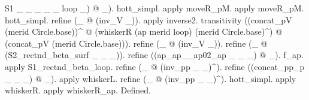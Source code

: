 \begin{coqdoccode}
\begin{coqdoccomment}
S1\coqdocindent{0.50em}
\_\coqdocindent{0.50em}
\_\coqdocindent{0.50em}
\_\coqdocindent{0.50em}
\_\coqdocindent{0.50em}
\_\coqdocindent{0.50em}
loop\coqdocindent{0.50em}
\_)\coqdocindent{0.50em}
@\coqdocindent{0.50em}
\_).\coqdoceol
\coqdocindent{1.00em}
hott\_simpl.\coqdocindent{0.50em}
\coqdoceol
\coqdocindent{1.00em}
apply\coqdocindent{0.50em}
moveR\_pM.\coqdocindent{0.50em}
apply\coqdocindent{0.50em}
moveR\_pM.\coqdocindent{0.50em}
hott\_simpl.\coqdocindent{0.50em}
refine\coqdocindent{0.50em}
(\_\coqdocindent{0.50em}
@\coqdocindent{0.50em}
(inv\_V\coqdocindent{0.50em}
\_)).\coqdocindent{0.50em}
\coqdoceol
\coqdocindent{1.00em}
apply\coqdocindent{0.50em}
inverse2.\coqdoceol
\coqdocindent{1.00em}
transitivity\coqdocindent{0.50em}
((concat\_pV\coqdocindent{0.50em}
(merid\coqdocindent{0.50em}
Circle.base))\^{}\coqdoceol
\coqdocindent{8.00em}
@\coqdocindent{0.50em}
(whiskerR\coqdocindent{0.50em}
(ap\coqdocindent{0.50em}
merid\coqdocindent{0.50em}
loop)\coqdocindent{0.50em}
(merid\coqdocindent{0.50em}
Circle.base)\^{})\coqdoceol
\coqdocindent{8.00em}
@\coqdocindent{0.50em}
(concat\_pV\coqdocindent{0.50em}
(merid\coqdocindent{0.50em}
Circle.base))).\coqdoceol
\coqdocindent{1.00em}
refine\coqdocindent{0.50em}
(\_\coqdocindent{0.50em}
@\coqdocindent{0.50em}
(inv\_V\coqdocindent{0.50em}
\_)).\coqdoceol
\coqdocindent{1.00em}
refine\coqdocindent{0.50em}
(\_\coqdocindent{0.50em}
@\coqdocindent{0.50em}
(S2\_rectnd\_beta\_surf\coqdocindent{0.50em}
\_\coqdocindent{0.50em}
\_\coqdocindent{0.50em}
\_)).\coqdoceol
\coqdocindent{1.00em}
refine\coqdocindent{0.50em}
((ap\_ap\_\_ap02\_ap\coqdocindent{0.50em}
\_\coqdocindent{0.50em}
\_\coqdocindent{0.50em}
\_)\coqdocindent{0.50em}
@\coqdocindent{0.50em}
\_).\coqdoceol
\coqdocindent{1.00em}
f\_ap.\coqdocindent{0.50em}
apply\coqdocindent{0.50em}
S1\_rectnd\_beta\_loop.\coqdoceol
\coqdocindent{1.00em}
refine\coqdocindent{0.50em}
(\_\coqdocindent{0.50em}
@\coqdocindent{0.50em}
(inv\_pp\coqdocindent{0.50em}
\_\coqdocindent{0.50em}
\_)\^{}).\coqdocindent{0.50em}
refine\coqdocindent{0.50em}
((concat\_pp\_p\coqdocindent{0.50em}
\_\coqdocindent{0.50em}
\_\coqdocindent{0.50em}
\_)\coqdocindent{0.50em}
@\coqdocindent{0.50em}
\_).\coqdocindent{0.50em}
apply\coqdocindent{0.50em}
whiskerL.\coqdoceol
\coqdocindent{1.00em}
refine\coqdocindent{0.50em}
(\_\coqdocindent{0.50em}
@\coqdocindent{0.50em}
(inv\_pp\coqdocindent{0.50em}
\_\coqdocindent{0.50em}
\_)\^{}).\coqdocindent{0.50em}
hott\_simpl.\coqdocindent{0.50em}
apply\coqdocindent{0.50em}
whiskerR.\coqdoceol
\coqdocindent{1.00em}
apply\coqdocindent{0.50em}
whiskerR\_ap.\coqdoceol
Defined.\coqdoceol
\end{coqdoccomment}
\coqdoceol
\coqdocemptyline
\end{coqdoccode}
